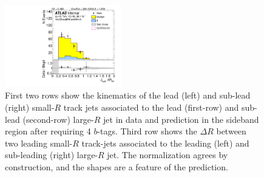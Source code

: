 \begin{figure}[htbp!]
\begin{center}
\includegraphics[width=0.45\textwidth,angle=-90]{figures/boosted/Sideband/b77_FourTag_Sideband_sublHCand_trk_dr.pdf}
  \caption{First two rows show the kinematics of the lead (left) and sub-lead (right) small-$R$ track jets associated to the lead (first-row) and sub-lead (second-row) large-$R$ jet in data and prediction in the sideband region after requiring 4 $b$-tags. Third row shows the $\Delta R$ between two leading small-$R$ track-jets associated to the leading (left) and sub-leading (right) large-$R$ jet. The normalization agrees by construction, and the shapes are a feature of the prediction. }
  \label{fig:boosted-4b-sideband-ak2}
\end{center}
\end{figure}


